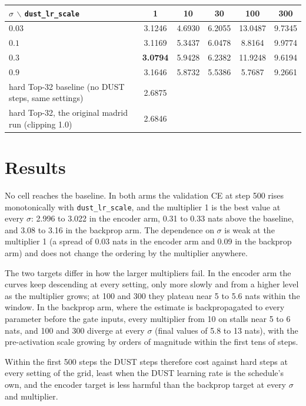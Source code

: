 \documentclass[11pt,a4paper]{article}
\newcommand{\code}[1]{\texttt{#1}}
\newcommand{\bst}[1]{\textbf{#1}}
\begin{document}
\begin{center}\small
\begin{tabular}{lccccc}
\toprule
$\sigma \,\backslash\, $\code{dust\_lr\_scale} & 1 & 10 & 30 & 100 & 300 \\
\midrule
$0.03$ & 3.1246 & 4.6930 & 6.2055 & 13.0487 & 9.7345 \\
$0.1$  & 3.1169 & 5.3437 & 6.0478 & 8.8164 & 9.9774 \\
$0.3$  & \bst{3.0794} & 5.9428 & 6.2382 & 11.9248 & 9.6194 \\
$0.9$  & 3.1646 & 5.8732 & 5.5386 & 5.7687 & 9.2661 \\
\midrule
hard Top-32 baseline (no DUST steps, same settings) & 2.6875 & & & & \\
hard Top-32, the original madrid run (clipping 1.0) & 2.6846 & & & & \\
\bottomrule
\end{tabular}
\end{center}

\section{Results}

No cell reaches the baseline. In both arms the validation CE at step 500
rises monotonically with \code{dust\_lr\_scale}, and the multiplier 1 is the
best value at every $\sigma$: 2.996 to 3.022 in the encoder arm, 0.31 to 0.33
nats above the baseline, and 3.08 to 3.16 in the backprop arm. The dependence
on $\sigma$ is weak at the multiplier 1 (a spread of 0.03 nats in the encoder
arm and 0.09 in the backprop arm) and does not change the ordering by the
multiplier anywhere.

The two targets differ in how the larger multipliers fail. In the encoder arm
the curves keep descending at every setting, only more slowly and from a
higher level as the multiplier grows; at 100 and 300 they plateau near 5 to
5.6 nats within the window. In the backprop arm, where the estimate is
backpropagated to every parameter before the gate inputs, every multiplier
from 10 on stalls near 5 to 6 nats, and 100 and 300 diverge at every $\sigma$
(final values of 5.8 to 13 nats), with the pre-activation scale growing by
orders of magnitude within the first tens of steps.

Within the first 500 steps the DUST steps therefore cost against hard steps
at every setting of the grid, least when the DUST learning rate is the
schedule's own, and the encoder target is less harmful than the backprop
target at every $\sigma$ and multiplier.
\end{document}
